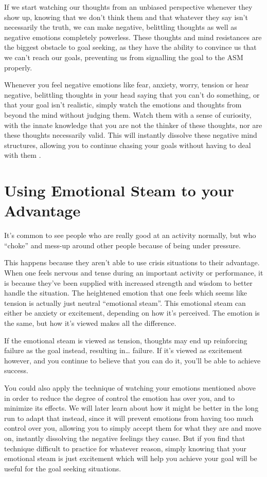 \documentclass[
]{book}
\begin{document}
If we start watching our thoughts from an unbiased perspective whenever they show up, knowing that we don't think them and that whatever they say isn't necessarily the truth, we can make negative, belittling thoughts as well as negative emotions completely powerless. These thoughts and mind resistances are the biggest obstacle to goal seeking, as they have the ability to convince us that we can't reach our goals, preventing us from signalling the goal to the ASM properly.

Whenever you feel negative emotions like fear, anxiety, worry, tension or hear negative, belittling thoughts in your head saying that you can't do something, or that your goal isn't realistic, simply watch the emotions and thoughts from beyond the mind without judging them. Watch them with a sense of curiosity, with the innate knowledge that you are not the thinker of these thoughts, nor are these thoughts necessarily valid. This will instantly dissolve these negative mind structures, allowing you to continue chasing your goals without having to deal with them \citep{acceptance}.

\hypertarget{using-emotional-steam-to-your-advantage}{%
\section{Using Emotional Steam to your Advantage}\label{using-emotional-steam-to-your-advantage}}

It's common to see people who are really good at an activity normally, but who ``choke'' and mess-up around other people because of being under pressure.

This happens because they aren't able to use crisis situations to their advantage. When one feels nervous and tense during an important activity or performance, it is because they've been supplied with increased strength and wisdom to better handle the situation. The heightened emotion that one feels which seems like tension is actually just neutral ``emotional steam''. This emotional steam can either be anxiety or excitement, depending on how it's perceived. The emotion is the same, but how it's viewed makes all the difference.

If the emotional steam is viewed as tension, thoughts may end up reinforcing failure as the goal instead, resulting in\ldots{} failure. If it's viewed as excitement however, and you continue to believe that you can do it, you'll be able to achieve success.

You could also apply the technique of watching your emotions mentioned above in order to reduce the degree of control the emotion has over you, and to minimize its effects. We will later learn about how it might be better in the long run to adapt that instead, since it will prevent emotions from having too much control over you, allowing you to simply accept them for what they are and move on, instantly dissolving the negative feelings they cause. But if you find that technique difficult to practice for whatever reason, simply knowing that your emotional steam is just excitement which will help you achieve your goal will be useful for the goal seeking situations.
\end{document}
